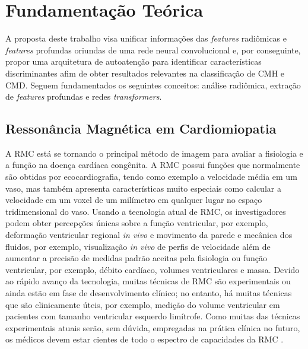 \chapter{Fundamentação Teórica}
\label{chap:fundamentacao_teorica}

A proposta deste trabalho visa unificar informações das \textit{features} radiômicas e \textit{features} profundas oriundas de uma rede neural convolucional e, por conseguinte, propor uma arquitetura de autoatenção para identificar características discriminantes afim de obter resultados relevantes na classificação de \gls{CMH} e \gls{CMD}. Seguem fundamentados os seguintes conceitos: análise radiômica, extração de \textit{features} profundas e redes \textit{transformers}.

\section{Ressonância Magnética em Cardiomiopatia}

A \gls{RMC} está se tornando o principal método de imagem para avaliar a fisiologia e a função na doença cardíaca congênita. A \gls{RMC} possui funções que normalmente são obtidas por ecocardiografia, tendo como exemplo a velocidade média em um vaso, mas também apresenta características muito especiais como calcular a velocidade em um voxel de um milímetro em qualquer lugar no espaço tridimensional do vaso.
Usando a tecnologia atual de \gls{RMC}, os investigadores podem obter percepções únicas sobre a função ventricular, por exemplo, deformação ventricular regional \textit{in vivo} e movimento da parede e mecânica dos fluidos, por exemplo, visualização \textit{in vivo} de perfis de velocidade além de aumentar a precisão de medidas padrão aceitas pela fisiologia ou função ventricular, por exemplo, débito cardíaco, volumes ventriculares e massa. Devido ao rápido avanço da tecnologia, muitas técnicas de \gls{RMC} são experimentais ou ainda estão em fase de desenvolvimento clínico; no entanto, há muitas técnicas que são clinicamente úteis, por exemplo, medição do volume ventricular em pacientes com tamanho ventricular esquerdo limítrofe. Como muitas das técnicas experimentais atuais serão, sem dúvida, empregadas na prática clínica no futuro, os médicos devem estar cientes de todo o espectro de capacidades da \gls{RMC} \cite{fogelAssessmentCardiacFunction2000}.

